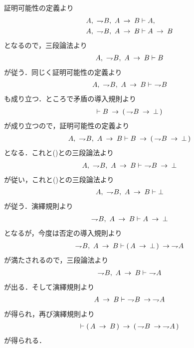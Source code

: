 	\begin{prf}
		証明可能性の定義より
		\begin{align}
			A,\ \negation B,\ A \rarrow B &\vdash A, \\
			A,\ \negation B,\ A \rarrow B &\vdash A \rarrow B
		\end{align}
		となるので，三段論法より
		\begin{align}
			A,\ \negation B,\ A \rarrow B \vdash B
			\label{fom:introduction_of_contraposition_1}
		\end{align}
		が従う．同じく証明可能性の定義より
		\begin{align}
			A,\ \negation B,\ A \rarrow B \vdash\ \negation B
			\label{fom:introduction_of_contraposition_2}
		\end{align}
		も成り立つ．ところで矛盾の導入規則より
		\begin{align}
			\vdash B \rarrow (\, \negation B \rarrow \bot\, )
		\end{align}
		が成り立つので，証明可能性の定義より
		\begin{align}
			A,\ \negation B,\ A \rarrow B \vdash
			B \rarrow (\, \negation B \rarrow \bot\, )
		\end{align}
		となる．これと()との三段論法より
		\begin{align}
			A,\ \negation B,\ A \rarrow B \vdash\ \negation B \rarrow \bot
		\end{align}
		が従い，これと()との三段論法より
		\begin{align}
			A,\ \negation B,\ A \rarrow B \vdash \bot
		\end{align}
		が従う．演繹規則より
		\begin{align}
			\negation B,\ A \rarrow B \vdash A \rarrow \bot
		\end{align}
		となるが，今度は否定の導入規則より
		\begin{align}
			\negation B,\ A \rarrow B \vdash 
			(\, A \rarrow \bot\, ) \rarrow \negation A
		\end{align}
		が満たされるので，三段論法より
		\begin{align}
			\negation B,\ A \rarrow B \vdash\ \negation A
		\end{align}
		が出る．そして演繹規則より
		\begin{align}
			A \rarrow B \vdash\ \negation B \rarrow \negation A
		\end{align}
		が得られ，再び演繹規則より
		\begin{align}
			\vdash (\, A \rarrow B\, ) \rarrow
			(\, \negation B \rarrow \negation A\, )
		\end{align}
		が得られる．
		\QED
	\end{prf}
	
